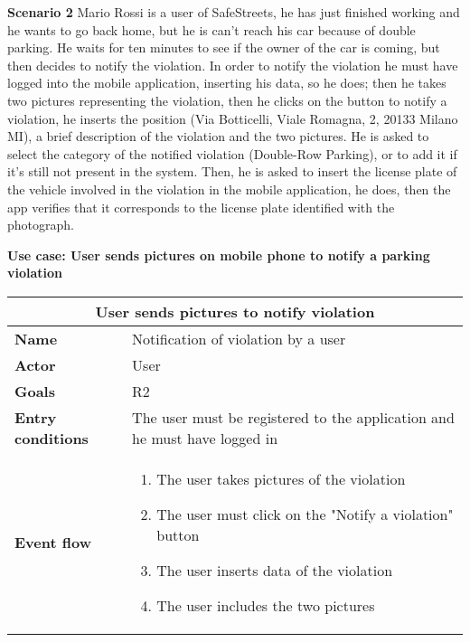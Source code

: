 \begin{description}
    \item \textbf{Scenario 2} \newline
        Mario Rossi is a user of SafeStreets, he has just finished working and he wants to go back home, but he is can't reach his car because of double parking. He waits for ten 
        minutes to see if the owner of the car is coming, but then decides to notify the violation. In order to notify the violation he must have logged into the mobile application, inserting his data, so he does; then he takes two pictures representing the violation, 
        then he clicks on the button to notify a violation, he inserts the position (Via Botticelli, Viale Romagna, 2, 20133 Milano MI), a brief description 
        of the violation and the two pictures. He is asked to select the category of the notified violation (Double-Row Parking), or to add it if it's still not present in the system.
        Then, he is asked to insert the license plate of the vehicle involved in the violation in the mobile application, he does, then the app verifies that it 
        corresponds to the license plate identified with the photograph.
    \item \textbf{Use case: User sends pictures on mobile phone to notify a parking violation}
    \begin{center}
        \begin{tabular}{|p{3cm}|p{7cm}|}
            \multicolumn{2}{c}{\textbf{User sends pictures to notify violation}} \\
            \hline
            \textbf{Name} & Notification of violation by a user \\
            \hline
            \textbf{Actor} & User \\
            \hline
            \textbf{Goals} & R2 \\
            \hline
            \textbf{Entry conditions} & The user must be registered to the application and he must have logged in \\
            \hline
            \textbf{Event flow} &
            \begin{enumerate}
                \item The user takes pictures of the violation
                \item The user must click on the "Notify a violation" button
                \item The user inserts data of the violation
                \item The user includes the two pictures 

\end{enumerate}
\end{tabular}
\end{center}
\end{description}
